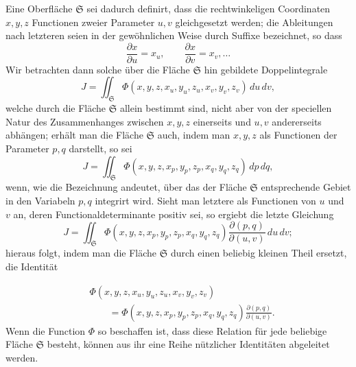 \documentclass[11pt,a4paper,leqno]{article}
\begin{document}
Eine Oberfläche $\mathfrak{S}$ sei dadurch definirt, dass die rechtwinkeligen Coordinaten $x,y,z$ Functionen zweier Parameter $u,v$ gleichgesetzt werden; die Ableitungen nach letzteren seien in der gewöhnlichen Weise durch Suffixe bezeichnet, so dass
\[
\frac{\partial x}{\partial u}=x_u,
\qquad
\frac{\partial x}{\partial v}=x_v,\ldots
\]
Wir betrachten dann solche über die Fläche $\mathfrak{S}$ hin gebildete Doppelintegrale
\[
J=\iint_{\mathfrak{S}}
\Phi(x,y,z,x_u,y_u,z_u,x_v,y_v,z_v)\,du\,dv,
\]
welche durch die Fläche $\mathfrak{S}$ allein bestimmt sind, nicht aber von der speciellen Natur des Zusammenhanges zwischen $x,y,z$ einerseits und $u,v$ andererseits abhängen; erhält man die Fläche $\mathfrak{S}$ auch, indem man $x,y,z$ als Functionen der Parameter $p,q$ darstellt, so sei
\[
J=\iint_{\mathfrak{S}}
\Phi(x,y,z,x_p,y_p,z_p,x_q,y_q,z_q)\,dp\,dq,
\]
wenn, wie die Bezeichnung andeutet, über das der Fläche $\mathfrak{S}$ entsprechende Gebiet in den Variabeln $p,q$ integrirt wird. Sieht man letztere als Functionen von $u$ und $v$ an, deren Functionaldeterminante positiv sei, so ergiebt die letzte Gleichung
\[
J=\iint_{\mathfrak{S}}
\Phi(x,y,z,x_p,y_p,z_p,x_q,y_q,z_q)
\frac{\partial(p,q)}{\partial(u,v)}\,du\,dv;
\]
hieraus folgt, indem man die Fläche $\mathfrak{S}$ durch einen beliebig kleinen Theil ersetzt, die Identität

\begin{equation}\tag{1}
\begin{aligned}
&\Phi(x,y,z,x_u,y_u,z_u,x_v,y_v,z_v)\\
&\qquad=
\Phi(x,y,z,x_p,y_p,z_p,x_q,y_q,z_q)
\frac{\partial(p,q)}{\partial(u,v)}.
\end{aligned}
\end{equation}
Wenn die Function $\Phi$ so beschaffen ist, dass diese Relation für jede beliebige Fläche $\mathfrak{S}$ besteht, können aus ihr eine Reihe nützlicher Identitäten abgeleitet werden.
\end{document}
